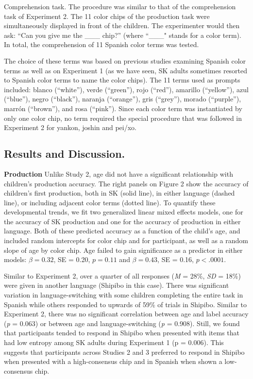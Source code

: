\documentclass[floatsintext,man]{apa6}
\theoremstyle{definition}
\theoremstyle{definition}
\theoremstyle{definition}
\theoremstyle{remark}
\begin{document}
Comprehension task. The procedure was similar to that of the
comprehension task of Experiment 2. The 11 color chips of the production
task were simultaneously displayed in front of the children. The
experimenter would then ask: \enquote{Can you give me the \_\_\_ chip?}
(where ``\_\_\_" stands for a color term). In total, the comprehension
of 11 Spanish color terms was tested.

The choice of these terms was based on previous studies examining
Spanish color terms as well as on Experiment 1 (as we have seen, SK
adults sometimes resorted to Spanish color terms to name the color
chips). The 11 terms used as prompts included: blanco (\enquote{white}),
verde (\enquote{green}), rojo (\enquote{red}), amarillo
(\enquote{yellow}), azul (\enquote{blue}), negro (\enquote{black}),
naranja (\enquote{orange}), gris (\enquote{grey}), morado
(\enquote{purple}), marrón (\enquote{brown}), and rosa (\enquote{pink}).
Since each color term was instantiated by only one color chip, no term
required the special procedure that was followed in Experiment 2 for
yankon, joshin and pei/xo.

\subsection{Results and Discussion.}\label{results-and-discussion.}

\textbf{Production} Unlike Study 2, age did not have a significant
relationship with children's production accuracy. The right panels on
Figure 2 show the accuracy of children's first production, both in SK
(solid line), in either language (dashed line), or including adjacent
color terms (dotted line). To quantify these developmental trends, we
fit two generalized linear mixed effects models, one for the accuracy of
SK production and one for the accuracy of production in either language.
Both of these predicted accuracy as a function of the child's age, and
included random intercepts for color chip and for participant, as well
as a random slope of age by color chip. Age failed to gain significance
as a predictor in either models: \(\beta = 0.32\), SE = 0.20,
\(p = 0.11\) and \(\beta = 0.43\), SE = 0.16, \(p < .0001\).

Similar to Experiment 2, over a quarter of all responses (\emph{M} =
28\%, \emph{SD} = 18\%) were given in another language (Shipibo in this
case). There was significant variation in language-switching with some
children completing the entire task in Spanish while others responded to
upwards of 59\% of trials in Shipibo. Similar to Experiment 2, there was
no significant correlation between age and label accuracy (\emph{p} =
0.063) or between age and language-switching (\emph{p} = 0.908). Still,
we found that participants tended to respond in Shipibo when presented
with items that had low entropy among SK adults during Experiment 1 (p =
0.006). This suggests that participants across Studies 2 and 3 preferred
to respond in Shipibo when presented with a high-consensus chip and in
Spanish when shown a low-consensus chip.
\end{document}

